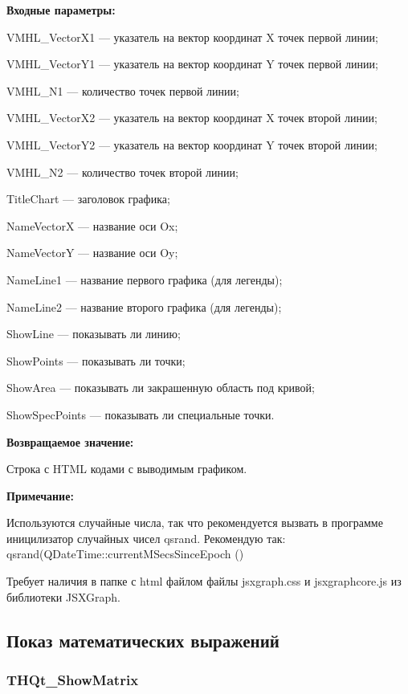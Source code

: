\documentclass[a4paper,12pt]{article}
\begin{document}
\textbf{Входные параметры:}
 
    VMHL\_VectorX1 --- указатель на вектор координат X точек первой линии;
 
    VMHL\_VectorY1 --- указатель на вектор координат Y точек первой линии;
 
    VMHL\_N1 --- количество точек первой линии;
 
    VMHL\_VectorX2 --- указатель на вектор координат X точек второй линии;
 
    VMHL\_VectorY2 --- указатель на вектор координат Y точек второй линии;
 
    VMHL\_N2 --- количество точек второй линии;
 
    TitleChart --- заголовок графика;
 
    NameVectorX --- название оси Ox;
 
    NameVectorY --- название оси Oy;
 
    NameLine1 --- название первого графика (для легенды);
 
    NameLine2 --- название второго графика (для легенды);
 
    ShowLine --- показывать ли линию;
 
    ShowPoints --- показывать ли точки;
 
    ShowArea --- показывать ли закрашенную область под кривой;
 
    ShowSpecPoints --- показывать ли специальные точки.

\textbf{Возвращаемое значение:}

Строка с HTML кодами с выводимым графиком.

\textbf{Примечание:}

Используются случайные числа, так что рекомендуется вызвать в программе иницилизатор случайных чисел qsrand. Рекомендую так: qsrand(QDateTime::currentMSecsSinceEpoch () %

Требует наличия в папке с html файлом файлы jsxgraph.css и jsxgraphcore.js из библиотеки JSXGraph.


\subsection{Показ математических выражений}

\subsubsection{THQt\_ShowMatrix}\label{THQt_ShowMatrix}
\end{document}
